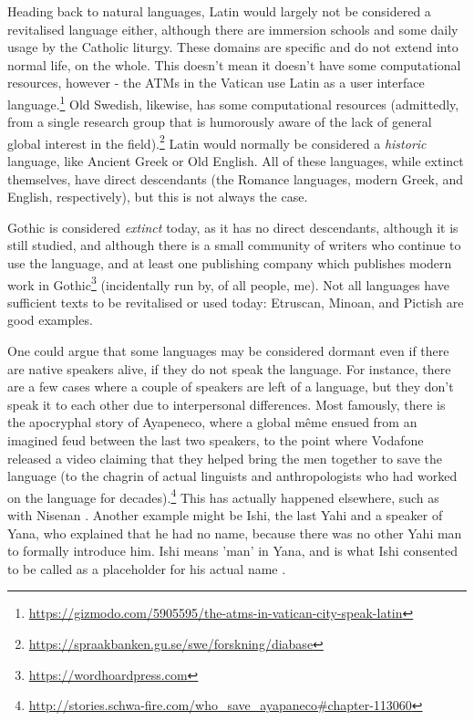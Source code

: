 Heading back to natural languages, Latin would largely not be considered a revitalised language either, although there are immersion schools and some daily usage by the Catholic liturgy. These domains are specific and do not extend into normal life, on the whole. This doesn't mean it doesn't have some computational resources, however - the ATMs in the Vatican use Latin as a user interface language.\footnote{\href{https://gizmodo.com/5905595/the-atms-in-vatican-city-speak-latin}{https://gizmodo.com/5905595/the-atms-in-vatican-city-speak-latin}} Old Swedish, likewise, has some computational resources (admittedly, from a single research group that is humorously aware of the lack of general global interest in the field).\footnote{\href{https://spraakbanken.gu.se/swe/forskning/diabase}{https://spraakbanken.gu.se/swe/forskning/diabase}} Latin would normally be considered a \textit{historic} language, like Ancient Greek or Old English. All of these languages, while extinct themselves, have direct descendants (the Romance languages, modern Greek, and English, respectively), but this is not always the case.

Gothic is considered \textit{extinct} today, as it has no direct descendants, although it is still studied, and although there is a small community of writers who continue to use the language, and at least one publishing company which publishes modern work in Gothic\footnote{\href{https://wordhoardpress.com}{https://wordhoardpress.com}} (incidentally run by, of all people, me). Not all languages have sufficient texts to be revitalised or used today: Etruscan, Minoan, and Pictish are good examples.

One could argue that some languages may be considered dormant even if there are native speakers alive, if they do not speak the language. For instance, there are a few cases where a couple of speakers are left of a language, but they don't speak it to each other due to interpersonal differences. Most famously, there is the apocryphal story of Ayapeneco, where a global m\^eme ensued from an imagined feud between the last two speakers, to the point where Vodafone released a video claiming that they helped bring the men together to save the language (to the chagrin of actual linguists and anthropologists who had worked on the language for decades).\footnote{\href{http://stories.schwa-fire.com/who\_save\_ayapaneco\#chapter-113060}{http://stories.schwa-fire.com/who\_save\_ayapaneco\#chapter-113060}} This has actually happened elsewhere, such as with Nisenan \citep{snyder2004practice}. Another example might be Ishi, the last Yahi and a speaker of Yana, who explained that he had no name, because there was no other Yahi man to formally introduce him. Ishi means 'man' in Yana, and is what Ishi consented to be called as a placeholder for his actual name \citep{kroeber1973ishi}.

